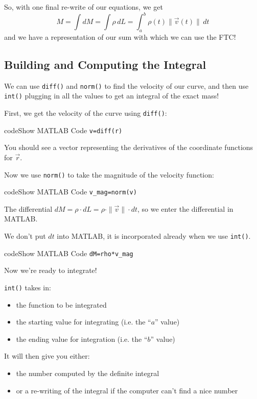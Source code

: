 \documentclass{ximera}
\begin{document}
So, with one final re-write of our equations, we get
\[
M = \int dM = \int \rho \, dL = \int_a^b \rho(t) \|\vec{v}(t)\| \, dt
\]
and we have a representation of our sum with which we can use the FTC!

\subsection*{Building and Computing the Integral}

We can use \texttt{diff()} and \texttt{norm()} to find the velocity of our curve, and then use \texttt{int()} plugging in all the values to get an integral of the exact mass!

First, we get the velocity of the curve using \texttt{diff()}:

\begin{expandable}{code}{Show MATLAB Code}
\texttt{v=diff(r)}
\end{expandable}

You should see a vector representing the derivatives of the coordinate functions for $\vec{r}$.

Now we use \texttt{norm()} to take the magnitude of the velocity function:

\begin{expandable}{code}{Show MATLAB Code}
\texttt{v\_mag=norm(v)}
\end{expandable}

The differential $dM = \rho \cdot dL = \rho \cdot \|\vec{v}\| \cdot dt$, so we enter the differential in MATLAB.

\begin{remark}
We don't put $dt$ into MATLAB, it is incorporated already when we use \texttt{int()}.
\end{remark}

\begin{expandable}{code}{Show MATLAB Code}
\texttt{dM=rho*v\_mag}
\end{expandable}

Now we're ready to integrate!

\texttt{int()} takes in:
\begin{itemize}
\item the function to be integrated
\item the starting value for integrating (i.e. the ``$a$'' value)
\item the ending value for integration (i.e. the ``$b$'' value)
\end{itemize}

It will then give you either:
\begin{itemize}
\item the number computed by the definite integral
\item or a re-writing of the integral if the computer can't find a nice number
\end{itemize}
\end{document}
